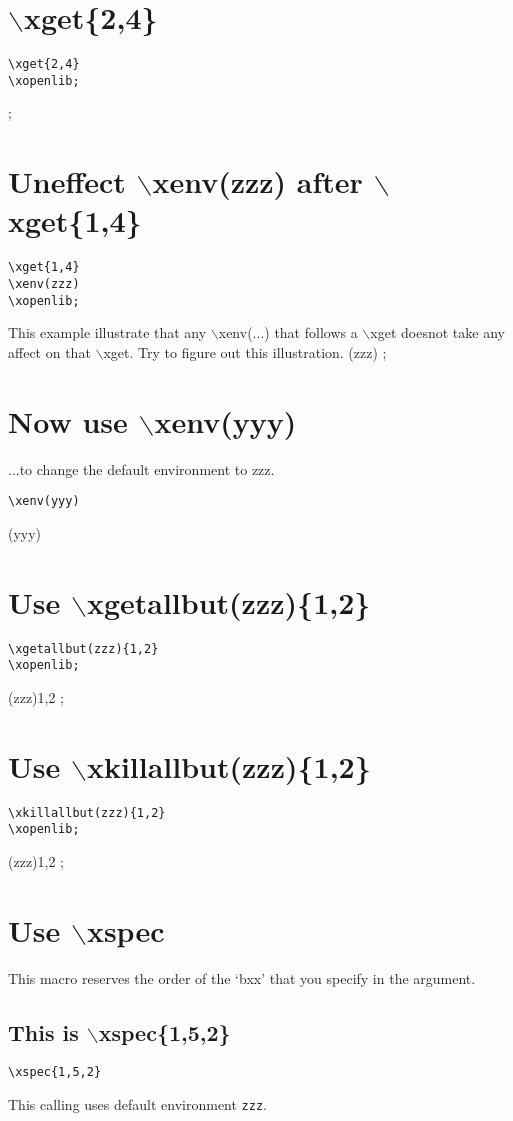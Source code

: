 \documentclass{article}
\def\back:{$\backslash$}
\begin{document}
\section{\back:xget\{2,4\}}
\begin{verbatim}
\xget{2,4}
\xopenlib;
\end{verbatim}
\xopenlib;

\section{Uneffect \back:xenv(zzz) after \back:xget\{1,4\}}
\begin{verbatim}
\xget{1,4}
\xenv(zzz)
\xopenlib;
\end{verbatim}
This example illustrate that any \back:xenv(...)
that follows a \back:xget doesnot take any affect on that \back:xget.
Try to figure out this illustration.
\xenv(zzz)
\xopenlib;

\section{Now use \back:xenv(yyy)}
...to change the default environment to zzz.
\begin{verbatim}
\xenv(yyy)
\end{verbatim}
\xenv(yyy)

\section{Use \back:xgetallbut(zzz)\{1,2\}}
\begin{verbatim}
\xgetallbut(zzz){1,2}
\xopenlib;
\end{verbatim}
\xgetallbut(zzz){1,2}
\xopenlib;

\section{Use \back:xkillallbut(zzz)\{1,2\}}
\begin{verbatim}
\xkillallbut(zzz){1,2}
\xopenlib;
\end{verbatim}
\xkillallbut(zzz){1,2}
\xopenlib;

\section{Use \back:xspec}
This macro reserves the order of the `bxx'
that you specify in the argument.

\subsection{This is \back:xspec\{1,5,2\}}
\begin{verbatim}
\xspec{1,5,2}
\end{verbatim}
This calling uses default environment  \verb~zzz~.
\end{document}
